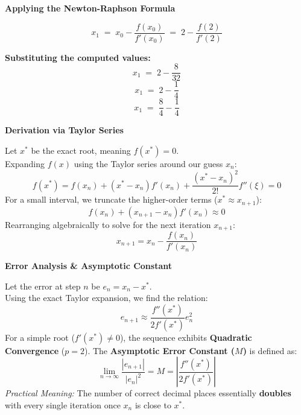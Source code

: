 \documentclass[12pt]{beamer}
\newcommand{\rarrow}{\Rightarrow}
\begin{document}
\begin{frame}{\textbf{Applying the Newton-Raphson Formula}}
  \begin{center}
    \vfill

    \[
      x_1 \;=\; x_0 - \frac{f(x_0)}{f'(x_0)}
            \;=\; 2 - \frac{f(2)}{f'(2)}
    \]

    \vspace{0.8em}
    \textbf{Substituting the computed values:}
    \[
      x_1 \;=\; 2 - \frac{8}{32}
    \]
    \[
      x_1 \;=\; 2 - \frac{1}{4}
    \]
    \[
      x_1 \;=\; \frac{8}{4} - \frac{1}{4}
    \]
    \rarrow{}
    \vfill
  \end{center}
\end{frame}


\begin{frame}{\textbf{Derivation via Taylor Series}}
  \begin{center}
  \vfill
  Let $x^*$ be the exact root, meaning $f(x^*) = 0$. \\
  Expanding $f(x)$ using the Taylor series around our guess $x_n$:
  \[
    f(x^*) = f(x_n) + (x^* - x_n)f'(x_n) + \frac{(x^* - x_n)^2}{2!}f''(\xi) = 0
  \]
  For a small interval, we truncate the higher-order terms ($x^* \approx x_{n+1}$):
  \[
    f(x_n) + (x_{n+1} - x_n)f'(x_n) \approx 0
  \]
  \vspace{0.5em}
  Rearranging algebraically to solve for the next iteration $x_{n+1}$:
  \[
    \boxed{ x_{n+1} = x_n - \frac{f(x_n)}{f'(x_n)} }
  \]
  \vfill
  \end{center}
\end{frame}

\begin{frame}{\textbf{Error Analysis \& Asymptotic Constant}}
  \begin{center}
  \vfill
  Let the error at step $n$ be $e_n = x_n - x^*$. \\
  Using the exact Taylor expansion, we find the relation:
  \[
    e_{n+1} \approx \frac{f''(x^*)}{2 f'(x^*)} e_n^2 
  \]
  \vspace{0.5em}
  For a simple root ($f'(x^*) \neq 0$), the sequence exhibits \textbf{Quadratic Convergence} ($p=2$). The \textbf{Asymptotic Error Constant ($M$)} is defined as:
  \[
    \lim_{n \to \infty} \frac{|e_{n+1}|}{|e_n|^2} = M = \left| \frac{f''(x^*)}{2f'(x^*)} \right|
  \]
  \vspace{0.5em}
  \textit{Practical Meaning:} The number of correct decimal places essentially \textbf{doubles} with every single iteration once $x_n$ is close to $x^*$.
  \vfill
  \end{center}
\end{frame}
\end{document}
